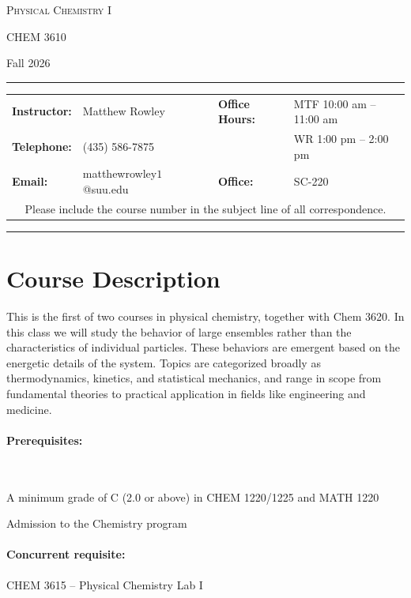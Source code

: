 \documentclass[12pt, letterpaper]{article}
\begin{document}
\begin{center}
	{\Large \textsc{Physical Chemistry I}}
	
	CHEM 3610
\end{center}

\begin{center}
	{\large Fall 2026}
\end{center}
\begin{center}
	\rule{0.99\textwidth}{0.4pt}
	\begin{tabular}{llcll}
		\textbf{Instructor:} & Matthew Rowley           &  & \textbf{Office Hours:} & MTF 10:00 am -- 11:00 am \\
		\textbf{Telephone:}  & (435) 586-7875           &  &                        & WR 1:00 pm -- 2:00 pm    \\
		\textbf{Email:}      & matthewrowley$1$@suu.edu &  & \textbf{Office:}       & SC-220                   \\
		\multicolumn{5}{c}{Please include the course number in the subject line of all correspondence.}
	\end{tabular}
	\rule{0.99\textwidth}{0.4pt}
\end{center}

\section*{Course Description}
This is the first of two courses in physical chemistry, together with Chem 3620. In this class we will study the behavior of large ensembles rather than the characteristics of individual particles. These behaviors are emergent based on the energetic details of the system. Topics are categorized broadly as thermodynamics, kinetics, and statistical mechanics, and range in scope from fundamental theories to practical application in fields like engineering and medicine.

\paragraph{Prerequisites:}~

A minimum grade of C (2.0 or above) in CHEM 1220/1225 and MATH 1220

Admission to the Chemistry program

\paragraph{Concurrent requisite:}
CHEM 3615 -- Physical Chemistry Lab I
\end{document}
